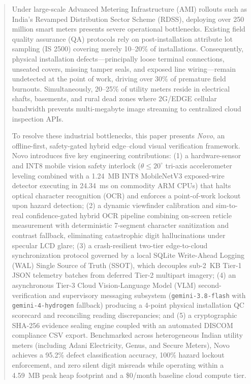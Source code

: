 \documentclass[conference]{IEEEtran}
\begin{document}
\begin{abstract}
Under large-scale Advanced Metering Infrastructure (AMI) rollouts such as India's Revamped Distribution Sector Scheme (RDSS), deploying over 250 million smart meters presents severe operational bottlenecks. Existing field quality assurance (QA) protocols rely on post-installation attribute lot sampling (IS 2500) covering merely 10--20\% of installations. Consequently, physical installation defects---principally loose terminal connections, unseated covers, missing tamper seals, and exposed line wiring---remain undetected at the point of work, driving over 30\% of premature field burnouts. Simultaneously, 20--25\% of utility meters reside in electrical shafts, basements, and rural dead zones where 2G/EDGE cellular bandwidth prevents multi-megabyte image streaming to centralized cloud inspection APIs. 

To resolve these industrial bottlenecks, this paper presents \textit{Novo}, an offline-first, safety-gated hybrid edge--cloud visual verification framework. Novo introduces five key engineering contributions: (1) a hardware-sensor and INT8 mobile vision safety interlock ($\theta \le 20^\circ$ tri-axis accelerometer leveling combined with a 1.24~MB INT8 MobileNetV3 exposed-wire detector executing in 24.34~ms on commodity ARM CPUs) that halts optical character recognition (OCR) and enforces a point-of-work lockout upon hazard detection; (2) a dynamic viewfinder calibration and sim-to-real confidence-gated hybrid OCR pipeline combining on-screen reticle measurement with deterministic 7-segment character sanitization and contrast fallback, eliminating catastrophic digit hallucinations under specular LCD glare; (3) a crash-resilient two-tier edge-to-cloud synchronization protocol governed by a local SQLite Write-Ahead Logging (WAL) Single Source of Truth (SSOT), which decouples sub-2~KB Tier-1 JSON telemetry batches from deferred Tier-2 multipart imagery; (4) an asynchronous Tier-3 Cloud Vision-Language Model (VLM) second-verification and supervisory messaging subsystem (\texttt{gemini-3.8-flash} with \texttt{gemini-4-hydrogen} fallback) producing a 4-point physical installation QC scorecard and reconciling reading discrepancies; and (5) a cryptographic SHA-256 evidence sealing engine coupled with an automated DISCOM compliance CSV export. Benchmarked across heterogeneous Indian utility meters (including Adani Electricity, Genus, and Secure Meters), Novo achieves a 95.2\% defect classification accuracy, 100\% hazard lockout enforcement, and zero silent digit misreads while operating within a 4.59~MB peak heap footprint and a \$0/month baseline cloud compute tier.
\end{abstract}
\end{document}
